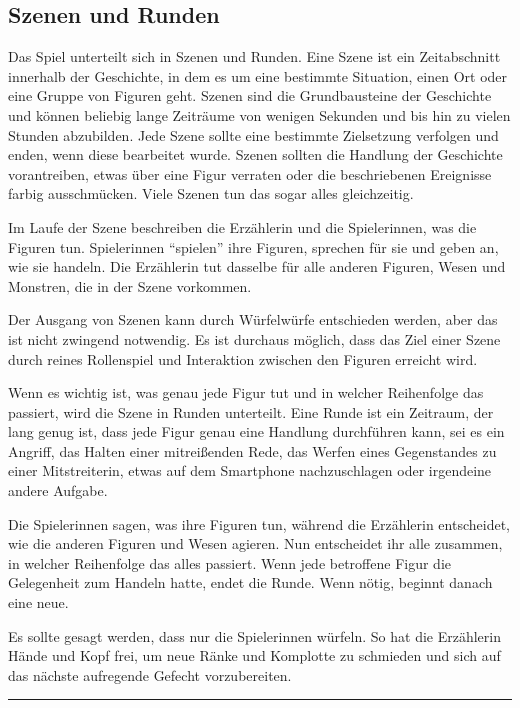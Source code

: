 \documentclass[]{article}
\begin{document}
\subsection{Szenen und Runden}\label{szenen-und-runden}

Das Spiel unterteilt sich in Szenen und Runden. Eine Szene ist ein
Zeitabschnitt innerhalb der Geschichte, in dem es um eine bestimmte
Situation, einen Ort oder eine Gruppe von Figuren geht. Szenen sind die
Grundbausteine der Geschichte und können beliebig lange Zeiträume von
wenigen Sekunden und bis hin zu vielen Stunden abzubilden. Jede Szene
sollte eine bestimmte Zielsetzung verfolgen und enden, wenn diese
bearbeitet wurde. Szenen sollten die Handlung der Geschichte
vorantreiben, etwas über eine Figur verraten oder die beschriebenen
Ereignisse farbig ausschmücken. Viele Szenen tun das sogar alles
gleichzeitig.

Im Laufe der Szene beschreiben die Erzählerin und die Spielerinnen, was
die Figuren tun. Spielerinnen ``spielen'' ihre Figuren, sprechen für sie
und geben an, wie sie handeln. Die Erzählerin tut dasselbe für alle
anderen Figuren, Wesen und Monstren, die in der Szene vorkommen.

Der Ausgang von Szenen kann durch Würfelwürfe entschieden werden, aber
das ist nicht zwingend notwendig. Es ist durchaus möglich, dass das Ziel
einer Szene durch reines Rollenspiel und Interaktion zwischen den
Figuren erreicht wird.

Wenn es wichtig ist, was genau jede Figur tut und in welcher Reihenfolge
das passiert, wird die Szene in Runden unterteilt. Eine Runde ist ein
Zeitraum, der lang genug ist, dass jede Figur genau eine Handlung
durchführen kann, sei es ein Angriff, das Halten einer mitreißenden
Rede, das Werfen eines Gegenstandes zu einer Mitstreiterin, etwas auf
dem Smartphone nachzuschlagen oder irgendeine andere Aufgabe.

Die Spielerinnen sagen, was ihre Figuren tun, während die Erzählerin
entscheidet, wie die anderen Figuren und Wesen agieren. Nun entscheidet
ihr alle zusammen, in welcher Reihenfolge das alles passiert. Wenn jede
betroffene Figur die Gelegenheit zum Handeln hatte, endet die Runde.
Wenn nötig, beginnt danach eine neue.

Es sollte gesagt werden, dass nur die Spielerinnen würfeln. So hat die
Erzählerin Hände und Kopf frei, um neue Ränke und Komplotte zu schmieden
und sich auf das nächste aufregende Gefecht vorzubereiten.

\begin{center}\rule{0.5\linewidth}{\linethickness}\end{center}
\end{document}
